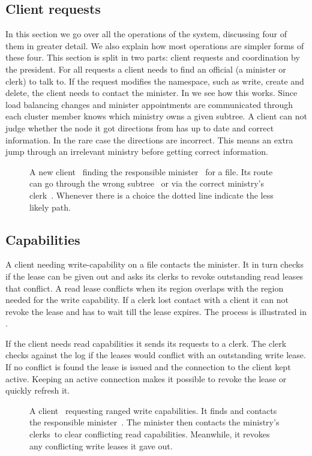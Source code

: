 \subsection{Client requests}
In this section we go over all the operations of the system, discussing four of them in greater detail. We also explain how most operations are simpler forms of these four. This section is split in two parts: client requests and coordination by the president.
%
For all requests a client needs to find an official (a minister or clerk) to talk to. If the request modifies the namespace, such as write, create and delete, the client needs to contact the minister. In  we see how this works. Since load balancing changes and minister appointments are communicated through \raft{} each cluster member knows which ministry owns a given subtree. A client can not judge whether the node it got directions from has up to date and correct information. In the rare case the directions are incorrect. This means an extra jump through an irrelevant ministry before getting correct information.
%
\begin{figure}[htbp]
	\centering
	
	\caption{A new client~\clientLeg{} finding the responsible minister~\amdsLeg{} for a file. Its route can go through the wrong subtree~\umdsLeg{} or via the correct ministry's clerk~\cmdsLeg{}. Whenever there is a choice the dotted line indicate the less likely path.}
	\label{fig:find_aMDS}
\end{figure}
%
\subsection*{Capabilities} \label{sec:lease}
A client needing write-capability on a file contacts the minister. It in turn checks if the lease can be given out and asks its clerks to revoke outstanding read leases that conflict. A read lease conflicts when its region overlaps with the region needed for the write capability. If a clerk lost contact with a client it can not revoke the lease and has to wait till the lease expires. The process is illustrated in . 

If the client needs read capabilities it sends its requests to a clerk. The clerk checks against the \raft{} log if the leases would conflict with an outstanding write lease. If no conflict is found the lease is issued and the connection to the client kept active. Keeping an active connection makes it possible to revoke the lease or quickly refresh it.
%
\begin{figure}[htbp]
	\centering
	
	\caption{A client~\clientLeg{} requesting ranged write capabilities. It finds and contacts the responsible minister~\amdsLeg{}. The minister then contacts the ministry's clerks~\cmdsLeg to clear conflicting read capabilities. Meanwhile, it revokes any conflicting write leases it gave out.}
	\label{fig:write}
\end{figure}
%
